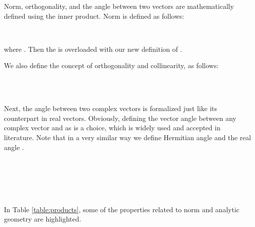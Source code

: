 \documentclass{llncs}
\begin{document}
{Norm, orthogonality, and the angle between two vectors are mathematically defined using the inner product.
Norm is defined as follows: 

\begin{definition} \\
\end{definition}
\noindent where . Then the  is overloaded with our new definition of .  


We also define the concept of orthogonality and collinearity, as follows: 
\begin{definition} \vspace{.2cm}\\
 \\
\end{definition}


Next, the angle between two complex vectors is formalized just like its counterpart in real vectors. Obviously, defining the vector angle between any complex vector and  as  is a choice, which is widely used and accepted in literature. Note that in a very similar way we define Hermitian angle and the real angle \cite{cangle_01}. 
\begin{definition} \vspace{.2cm}\\
\\
 \\
\\
\end{definition}

In Table \ref{table:products}, some of the properties related to norm and analytic geometry are highlighted. 


}
\end{document}
